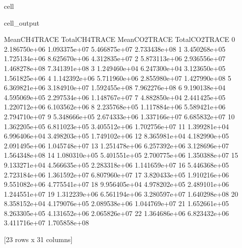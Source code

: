 \documentclass[letterpaper,10pt,english]{jupyterBook}
\begin{document}
\begin{sphinxuseclass}{cell}
\begin{sphinxVerbatimOutput}
\begin{sphinxuseclass}{cell_output}
\begin{sphinxVerbatim}[commandchars=\\\{\}]
   Mean\PYGZus{}CH4\PYGZus{}TRACE  Total\PYGZus{}CH4\PYGZus{}TRACE  Mean\PYGZus{}CO2\PYGZus{}TRACE  Total\PYGZus{}CO2\PYGZus{}TRACE  
0    2.186750e+06     1.093375e+07    5.466875e+07     2.733438e+08  
1    3.450268e+05     1.725134e+06    8.625670e+06     4.312835e+07  
2    5.873113e+06     2.936556e+07    1.468278e+08     7.341391e+08  
3    1.249460e+04     6.247300e+04    3.123650e+05     1.561825e+06  
4    1.142392e+06     5.711960e+06    2.855980e+07     1.427990e+08  
5    6.369821e+06     3.184910e+07    1.592455e+08     7.962276e+08  
6    9.190138e+04     4.595069e+05    2.297534e+06     1.148767e+07  
7    4.882850e+04     2.441425e+05    1.220712e+06     6.103562e+06  
8    2.235768e+05     1.117884e+06    5.589421e+06     2.794710e+07  
9    5.348666e+05     2.674333e+06    1.337166e+07     6.685832e+07  
10   1.362205e+05     6.811023e+05    3.405512e+06     1.702756e+07  
11   1.399281e+04     6.996406e+04    3.498203e+05     1.749102e+06  
12   8.365981e+04     4.182990e+05    2.091495e+06     1.045748e+07  
13   1.251478e+06     6.257392e+06    3.128696e+07     1.564348e+08  
14   1.080310e+05     5.401551e+05    2.700775e+06     1.350388e+07  
15   9.133271e+04     4.566635e+05    2.283318e+06     1.141659e+07  
16   5.446368e+05     2.723184e+06    1.361592e+07     6.807960e+07  
17   3.820433e+05     1.910216e+06    9.551082e+06     4.775541e+07  
18   9.956405e+04     4.978202e+05    2.489101e+06     1.244551e+07  
19   1.312239e+06     6.561194e+06    3.280597e+07     1.640298e+08  
20   8.358152e+04     4.179076e+05    2.089538e+06     1.044769e+07  
21   1.652661e+05     8.263305e+05    4.131652e+06     2.065826e+07  
22   1.364686e+06     6.823432e+06    3.411716e+07     1.705858e+08  

[23 rows x 31 columns]
\end{sphinxVerbatim}

\end{sphinxuseclass}\end{sphinxVerbatimOutput}

\end{sphinxuseclass}
\end{document}
